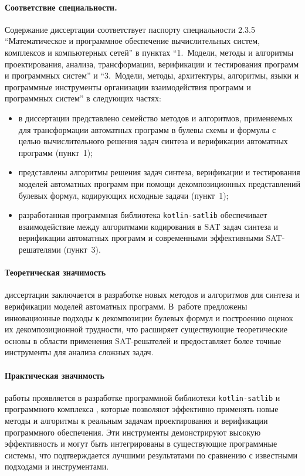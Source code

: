 \paragraph{Соответствие специальности.}
%
Содержание диссертации соответствует паспорту специальности 2.3.5 \enquote{Математическое и программное обеспечение вычислительных систем, комплексов и компьютерных сетей} в пунктах \enquote{1.~Модели, методы и алгоритмы проектирования, анализа, трансформации, верификации и тестирования программ и программных систем} и \enquote{3.~Модели, методы, архитектуры, алгоритмы, языки и программные инструменты организации взаимодействия программ и программных систем} в следующих частях:
\begin{itemize}[beginpenalty=10000]
    \item в диссертации представлено семейство методов и алгоритмов, применяемых для трансформации автоматных программ в булевы схемы и формулы с целью вычислительного решения задач синтеза и верификации автоматных программ (пункт~1);
    \item представлены алгоритмы решения задач синтеза, верификации и тестирования моделей автоматных программ при помощи декомпозиционных представлений булевых формул, кодирующих исходные задачи (пункт~1);
    \item разработанная программная библиотека \texttt{kotlin-satlib} обеспечивает взаимодействие между алгоритмами кодирования в SAT задач синтеза и верификации автоматных программ и современными эффективными SAT-решателями (пункт~3).
\end{itemize}


%
%
\paragraph{Теоретическая значимость} диссертации заключается в разработке новых методов и алгоритмов для синтеза и верификации моделей автоматных программ.
В~работе предложены инновационные подходы к декомпозиции булевых формул и построению оценок их декомпозиционной трудности, что расширяет существующие теоретические основы в области применения SAT-решателей и предоставляет более точные инструменты для анализа сложных задач.

%
%
\paragraph{Практическая значимость} работы проявляется в разработке программной библиотеки \texttt{kotlin-satlib} и программного комплекса , которые позволяют эффективно применять новые методы и алгоритмы к реальным задачам проектирования и верификации программного обеспечения.
Эти инструменты демонстрируют высокую эффективность и могут быть интегрированы в существующие программные системы, что подтверждается лучшими результатами по сравнению с известными подходами и инструментами.


